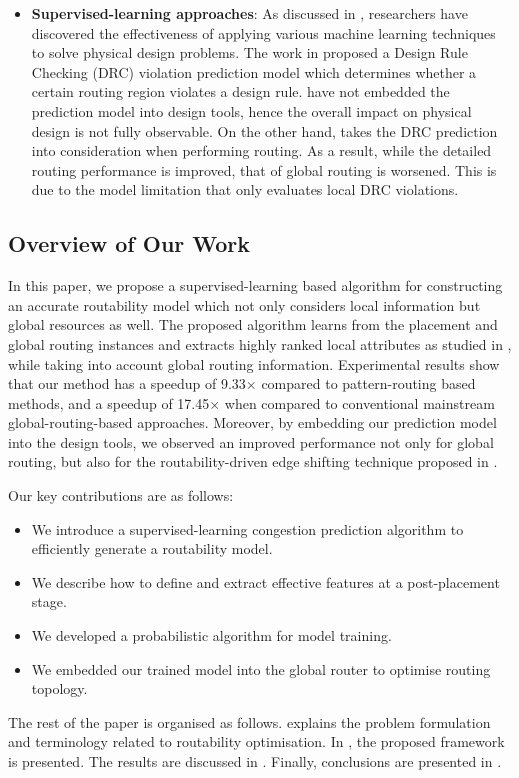 \begin{itemize}
\item \textbf{Supervised-learning approaches}: As discussed in \cite{mlinphysicaldesign}, researchers have discovered the effectiveness of applying various machine learning techniques to solve physical design problems. The work in \cite{drcpredict18} proposed a Design Rule Checking (DRC) violation prediction model which determines whether a certain routing region  violates a design rule.   \cite{drcpredict18,drcDAT18} have not embedded the prediction model into design tools, hence the overall impact on physical design is not fully observable. On the other hand, \cite{drcingr} takes the DRC prediction into consideration when performing routing. As a result, while the detailed routing performance is improved, that of global routing is worsened. This is  due to the model limitation that only evaluates local DRC violations.
\end{itemize}


\subsection{Overview of Our Work}
In this paper, we propose a supervised-learning based algorithm for constructing an accurate routability model which not only considers local information but global resources as well.
The proposed algorithm learns from the placement and global routing instances and extracts highly ranked local attributes as studied in \cite{parameterstudy}, while taking into account global routing information.
Experimental results show that our method has a speedup of 9.33$\times$ compared to pattern-routing based methods, and a speedup of 17.45$\times$ when compared to conventional mainstream global-routing-based approaches.
Moreover, by embedding our prediction model into the design tools, we observed an improved performance not only for global routing, but also for the routability-driven edge shifting technique proposed in \cite{fastroute}.


Our key contributions are as follows:
\begin{itemize}
\item We introduce  a supervised-learning congestion prediction algorithm to efficiently generate a routability model.
\item We describe how to define and extract effective features at a post-placement stage.
\item We developed a probabilistic algorithm for model training.
\item We embedded our trained model into the global router to optimise routing topology.
\end{itemize}

The rest of the paper is organised as follows.
 explains the problem formulation and terminology related to routability optimisation.
In , the proposed framework is presented.
The results are discussed in . Finally, conclusions are presented in .

